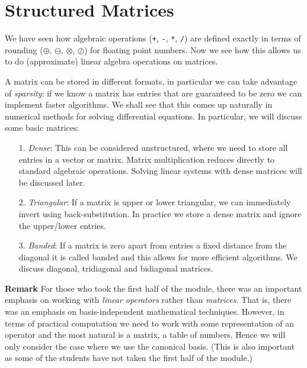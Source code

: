 
\section{Structured Matrices}
We have seen how algebraic operations (\texttt{+}, \texttt{-}, \texttt{*}, \texttt{/}) are defined exactly in terms of rounding ($\ensuremath{\oplus}$, $\ensuremath{\ominus}$, $\ensuremath{\otimes}$, $\ensuremath{\oslash}$)  for floating point numbers. Now we see how this allows us to do (approximate) linear algebra operations on matrices. 

A matrix can be stored in different formats, in particular we can take advantage of \emph{sparsity}: if we know a matrix has entries that are guaranteed to be zero we can implement faster algorithms. We shall see that this comes up naturally in numerical methods for solving differential equations.  In particular, we will discuss some basic matrices:

\begin{itemize}
\item[1. ] \emph{Dense}: This can be considered unstructured, where we need to store all entries in a vector or matrix. Matrix multiplication reduces directly to standard algebraic operations. Solving linear systems with dense matrices will be discussed later.


\item[2. ] \emph{Triangular}: If a matrix is upper or lower triangular, we can immediately invert using back-substitution. In practice we store a dense matrix and ignore the upper/lower entries.


\item[3. ] \emph{Banded}: If a matrix is zero apart from entries a fixed distance from  the diagonal it is called banded and this allows for more efficient algorithms. We discuss diagonal, tridiagonal and bidiagonal matrices.

\end{itemize}
\textbf{Remark} For those who took the first half of the module, there was an important emphasis on working with \emph{linear operators} rather than \emph{matrices}. That is, there was an emphasis on basis-independent mathematical techniques. However, in terms of practical computation we need to work with some representation of an operator and the  most natural is a matrix, a table of numbers. Hence we will only consider the case where we use the canonical basis. (This is also important as some of the students have not taken the first half of the module.)

